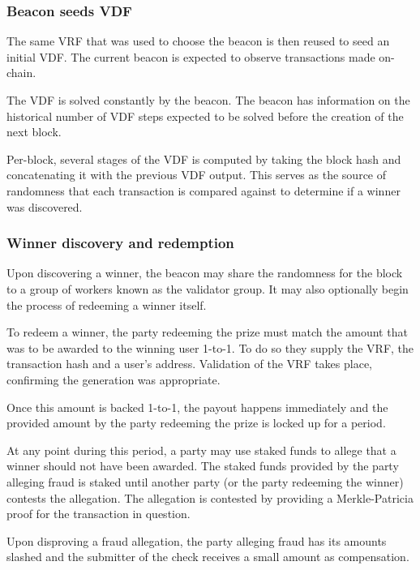 \subsubsection{Beacon seeds VDF}


The same VRF that was used to choose the beacon is then reused to seed an initial VDF. The current beacon is expected to observe transactions made on-chain.

The VDF is solved constantly by the beacon. The beacon has information on the historical number of VDF steps expected to be solved before the creation of the next block.

Per-block, several stages of the VDF is computed by taking the block hash and concatenating it with the previous VDF output. This serves as the source of randomness that each transaction is compared against to determine if a winner was discovered.

\subsubsection{Winner discovery and redemption}

Upon discovering a winner, the beacon may share the randomness for the block to a group of workers known as the validator group. It may also optionally begin the process of redeeming a winner itself.

To redeem a winner, the party redeeming the prize must match the amount that was to be awarded to the winning user 1-to-1. To do so they supply the VRF, the transaction hash and a user's address. Validation of the VRF takes place, confirming the generation was appropriate.

Once this amount is backed 1-to-1, the payout happens immediately and the provided amount by the party redeeming the prize is locked up for a period.

At any point during this period, a party may use staked funds to allege that a winner should not have been awarded. The staked funds provided by the party alleging fraud is staked until another party (or the party redeeming the winner) contests the allegation. The allegation is contested by providing a Merkle-Patricia proof for the transaction in question.

Upon disproving a fraud allegation, the party alleging fraud has its amounts slashed and the submitter of the check receives a small amount as compensation.

